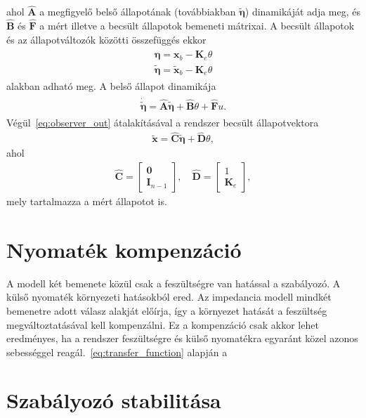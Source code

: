 ahol $\hat{\bm A}$ a megfigyelő belső állapotának (továbbiakban $\tilde{\bm \eta}$) 
dinamikáját adja meg, és $\hat{\bm B}$ és $\hat{\bm F}$ a mért illetve a becsült állapotok 
bemeneti mátrixai. A becsült állapotok és az állapotváltozók közötti összefüggés ekkor
\begin{align}
    \begin{split}
    \bm \eta = \bm x_b - \bm K_e \theta \\
    \tilde{\bm \eta} = \tilde{\bm x}_b - \bm K_e \theta
    \end{split}
\end{align}
alakban adható meg. A belső állapot dinamikája
\begin{align}
    \begin{split}
    \dot{\tilde{\bm \eta}} = \hat{\bm A} \tilde{\bm \eta} + \hat{\bm B} \theta + \hat{\bm F} u.
    \end{split}
\end{align}
Végül~\eqref{eq:observer_out} átalakításával a rendszer becsült állapotvektora
\begin{align}
    \tilde{\bm x} = \hat{\bm C} \tilde{\bm \eta} + \hat{\bm D} \theta,
\end{align}
ahol
\begin{align}
    \hat{\bm C} = 
    \begin{bmatrix}
        \bm 0 \\
        \bm I_{n-1}
    \end{bmatrix},
    \quad
    \hat{\bm D} = 
    \begin{bmatrix}
        1 \\
        \bm K_e
    \end{bmatrix},
\end{align}
mely tartalmazza a mért állapotot is.

\section{Nyomaték kompenzáció}
A modell két bemenete közül csak a feszültségre van hatással a 
szabályozó. A külső nyomaték környezeti hatásokból ered. Az impedancia 
modell mindkét bemenetre adott válasz alakját előírja, így a környezet 
hatását a feszültség megváltoztatásával kell kompenzálni. Ez a kompenzáció
csak akkor lehet eredményes, ha a rendszer feszültségre és külső nyomatékra 
egyaránt közel azonos sebességgel reagál.~\eqref{eq:transfer_function} alapján
a 

\section{Szabályozó stabilitása}

